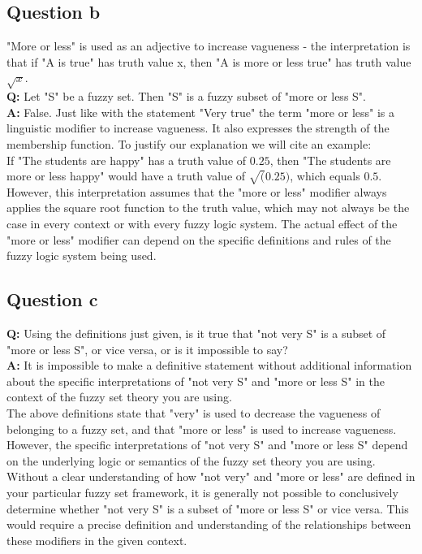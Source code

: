 \subsection{Question b}
"More or less" is used as an adjective to increase vagueness - the interpretation is that if "A is true" has truth value x, then "A is more or less true" has truth value $\sqrt{x}$.\\
\textbf{Q: }Let "S" be a fuzzy set. Then "S" is a fuzzy subset of "more or less S".\\
\textbf{A: }False. Just like with the statement "Very true" the term "more or less" is a linguistic modifier to increase vagueness. It also expresses the strength of the membership function. To justify our explanation we will cite an example:\\
If "The students are happy" has a truth value of $0.25$, then "The students are more or less happy" would have a truth value of $\sqrt(0.25)$, which equals $0.5$.\\
However, this interpretation assumes that the "more or less" modifier always applies the square root function to the truth value, which may not always be the case in every context or with every fuzzy logic system. The actual effect of the "more or less" modifier can depend on the specific definitions and rules of the fuzzy logic system being used.
\subsection{Question c}
\textbf{Q: }Using the definitions just given, is it true that "not very S" is a subset of "more or less S", or vice versa, or is it impossible to say?\\
\textbf{A: }It is impossible to make a definitive statement without additional information about the specific interpretations of "not very S" and "more or less S" in the context of the fuzzy set theory you are using.\\
The above definitions state that "very" is used to decrease the vagueness of belonging to a fuzzy set, and that "more or less" is used to increase vagueness. However, the specific interpretations of "not very S" and "more or less S" depend on the underlying logic or semantics of the fuzzy set theory you are using.\\
Without a clear understanding of how "not very" and "more or less" are defined in your particular fuzzy set framework, it is generally not possible to conclusively determine whether "not very S" is a subset of "more or less S" or vice versa. This would require a precise definition and understanding of the relationships between these modifiers in the given context.
